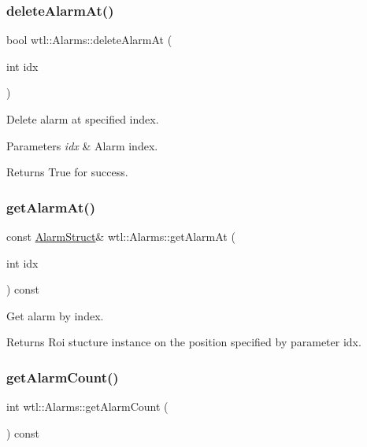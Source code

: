 \subsubsection{\texorpdfstring{delete\+Alarm\+At()}{deleteAlarmAt()}}
{\footnotesize\ttfamily bool wtl\+::\+Alarms\+::delete\+Alarm\+At (\begin{DoxyParamCaption}\item[{int}]{idx }\end{DoxyParamCaption})}



Delete alarm at specified index. 


\begin{DoxyParams}{Parameters}
{\em idx} & Alarm index. \\
\hline
\end{DoxyParams}
\begin{DoxyReturn}{Returns}
True for success. 
\end{DoxyReturn}
\mbox{\label{classwtl_1_1_alarms_aea1ae385de429cb375351e28873b0c3c}} 
\subsubsection{\texorpdfstring{get\+Alarm\+At()}{getAlarmAt()}}
{\footnotesize\ttfamily const \hyperlink{structwtl_1_1_alarm_struct}{Alarm\+Struct}\& wtl\+::\+Alarms\+::get\+Alarm\+At (\begin{DoxyParamCaption}\item[{int}]{idx }\end{DoxyParamCaption}) const}



Get alarm by index. 

\begin{DoxyReturn}{Returns}
Roi stucture instance on the position specified by parameter idx. 
\end{DoxyReturn}
\mbox{\label{classwtl_1_1_alarms_a35140892038d14ec3304d4fc8bfadd85}} 
\subsubsection{\texorpdfstring{get\+Alarm\+Count()}{getAlarmCount()}}
{\footnotesize\ttfamily int wtl\+::\+Alarms\+::get\+Alarm\+Count (\begin{DoxyParamCaption}{ }\end{DoxyParamCaption}) const}



